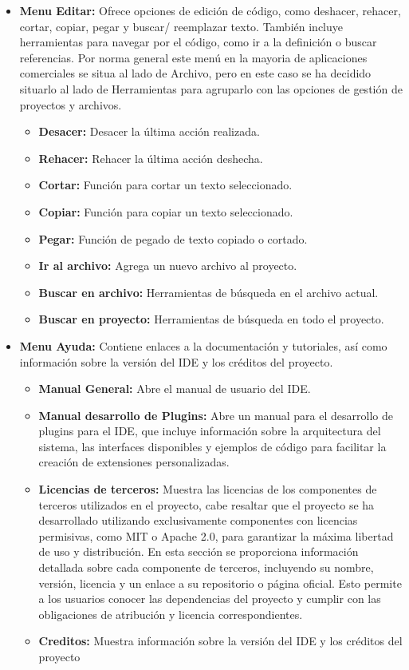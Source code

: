 \documentclass[../main.tex]{subfiles}
\begin{document}
\begin{itemize}
    \item \textbf{Menu Editar:} Ofrece opciones de edición de código, como deshacer, rehacer, cortar, copiar, pegar y buscar/ reemplazar texto. También incluye herramientas para navegar por el código, como ir a la definición o buscar referencias. Por norma general este menú en la mayoria de aplicaciones comerciales se situa al lado de Archivo, pero en este caso se ha decidido situarlo al lado de Herramientas para agruparlo con las opciones de gestión de proyectos y archivos.
        \begin{itemize}
        \item \textbf{Desacer:} Desacer la última acción realizada.
        \item \textbf{Rehacer:} Rehacer la última acción deshecha.
        \item \textbf{Cortar:} Función para cortar un texto seleccionado.
        \item \textbf{Copiar:} Función para copiar un texto seleccionado.
        \item \textbf{Pegar:} Función de pegado de texto copiado o cortado.
        \item \textbf{Ir al archivo:} Agrega un nuevo archivo al proyecto.
        \item \textbf{Buscar en archivo:} Herramientas de búsqueda en el archivo actual.
        \item \textbf{Buscar en proyecto:} Herramientas de búsqueda en todo el proyecto.
    \end{itemize}
    \item \textbf{Menu Ayuda:} Contiene enlaces a la documentación y tutoriales, así como información sobre la versión del IDE y los créditos del proyecto.
    \begin{itemize}
        \item \textbf{Manual General:} Abre el manual de usuario del IDE.
        \item \textbf{Manual desarrollo de Plugins:} Abre un manual para el desarrollo de plugins para el IDE, que incluye información sobre la arquitectura del sistema, las interfaces disponibles y ejemplos de código para facilitar la creación de extensiones personalizadas.
        \item \textbf{Licencias de terceros:} Muestra las licencias de los componentes de terceros utilizados en el proyecto, cabe resaltar que el proyecto se ha desarrollado utilizando exclusivamente componentes con licencias permisivas, como MIT o Apache 2.0, para garantizar la máxima libertad de uso y distribución. En esta sección se proporciona información detallada sobre cada componente de terceros, incluyendo su nombre, versión, licencia y un enlace a su repositorio o página oficial. Esto permite a los usuarios conocer las dependencias del proyecto y cumplir con las obligaciones de atribución y licencia correspondientes.
        \item \textbf{Creditos:} Muestra información sobre la versión del IDE y los créditos del proyecto
    \end{itemize}

\end{itemize}
\end{document}
